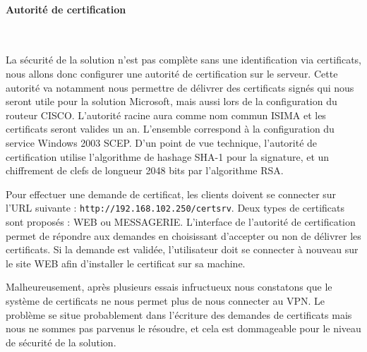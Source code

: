 



\paragraph{Autorité de certification}
\label{autorité_certification}~

La sécurité de la solution n'est pas complète sans une identification via certificats, nous allons donc configurer une autorité de certification sur le serveur. Cette autorité va notamment nous permettre de délivrer des certificats signés qui nous seront utile pour la solution Microsoft, mais aussi lors de la configuration du routeur CISCO. L'autorité racine aura comme nom commun ISIMA et les certificats seront valides un an. L'ensemble correspond à la configuration du service Windows 2003 SCEP. D'un point de vue technique, l'autorité de certification utilise l'algorithme de hashage SHA-1 pour la signature, et un chiffrement de clefs de longueur 2048 bits par l'algorithme RSA.

Pour effectuer une demande de certificat, les clients doivent se connecter sur l'URL suivante : \verb|http://192.168.102.250/certsrv|. Deux types de certificats sont proposés : WEB ou MESSAGERIE. L'interface de l'autorité de certification permet de répondre aux demandes en choisissant d'accepter ou non de délivrer les certificats. Si la demande est validée, l'utilisateur doit se connecter à nouveau sur le site WEB afin d'installer le certificat sur sa machine.

Malheureusement, après plusieurs essais infructueux nous constatons que le système de certificats ne nous permet plus de nous connecter au VPN. Le problème se situe probablement dans l'écriture des demandes de certificats mais nous ne sommes pas parvenus le résoudre, et cela est dommageable pour le niveau de sécurité de la solution.

